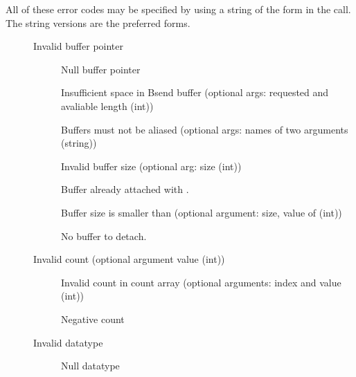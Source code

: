 All of these error codes may be specified by using a string of the
form  in the  call.  The
string versions are the preferred forms.
\def\mpiderrconst#1{\relax}
\begin{description}
\item[ ]Invalid buffer pointer
    \begin{description}
    \item[\mpiderrconst{MPIi_ERR_BUFFER_NULL} ]Null buffer pointer
    \item[\mpiderrconst{MPIi_ERR_BUFFER_NOSPACE}
    ]Insufficient space in Bsend 
      buffer (optional args: requested and avaliable length (int))
    \item[\mpiderrconst{MPIi_ERR_BUFFER_ALIAS} ]Buffers
    must not be aliased 
      (optional args: names of two arguments (string))
    \item[\mpiderrconst{MPIi_ERR_BUFFER_SIZE} ]Invalid
    buffer size (optional arg: 
      size (int))
    \item[\mpiderrconst{MPIi_ERR_BUFFER_BSEND_EXISTS}
    ]Buffer already attached with 
      . 
    \item[\mpiderrconst{MPIi_ERR_BUFFER_BSEND_SMALL}
    ]Buffer size is smaller than 
       (optional argument: size, value of
       (int)) 
    \item[\mpiderrconst{MPIi_ERR_BUFFER_BSEND_NONE} ]No
    buffer to detach. 
    \end{description}
\item[ ]Invalid count (optional
    argument value (int)) 
    \begin{description}
    \item[\mpiderrconst{MPIi_ERR_COUNT_ARRAY} ]Invalid
    count in count array 
      (optional arguments: index and value (int))
    \item[\mpiderrconst{MPIi_ERR_COUNT_NEG} ]Negative count
    \end{description}
\item[ ]Invalid datatype
    \begin{description}
    \item[\mpiderrconst{MPIi_ERR_TYPE_NULL} ]Null datatype

\end{description}
\end{description}
